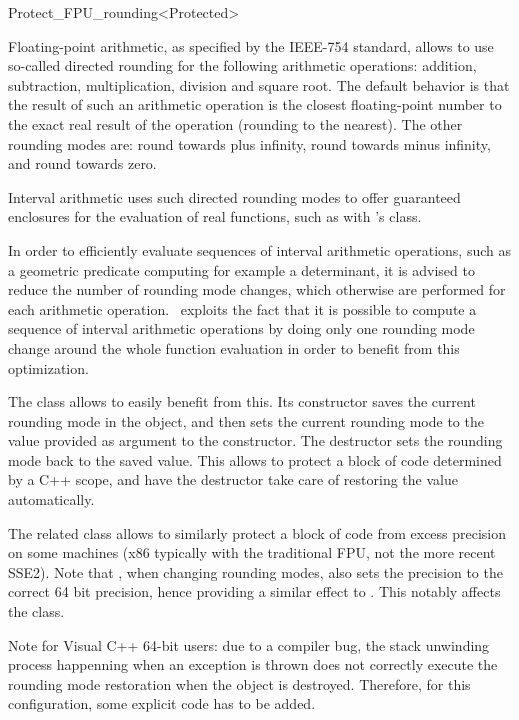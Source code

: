 
\begin{ccRefClass}{Protect_FPU_rounding<Protected>}
\label{protect_fpu_rouding}

\ccDefinition

Floating-point arithmetic, as specified by the IEEE-754 standard, allows to use
so-called directed rounding for the following arithmetic operations: addition,
subtraction, multiplication, division and square root.  The default behavior is
that the result of such an arithmetic operation is the closest floating-point
number to the exact real result of the operation (rounding to the nearest).
The other rounding modes are: round towards plus infinity, round towards minus
infinity, and round towards zero.

Interval arithmetic uses such directed rounding modes to offer guaranteed
enclosures for the evaluation of real functions, such as with \cgal's
 class.

In order to efficiently evaluate sequences of interval arithmetic operations,
such as a geometric predicate computing for example a determinant, it is
advised to reduce the number of rounding mode changes, which otherwise are
performed for each arithmetic operation.  \cgal\ exploits the fact that it is
possible to compute a sequence of interval arithmetic operations by doing only
one rounding mode change around the whole function evaluation in order to
benefit from this optimization.

The class  allows to easily benefit from this.
Its constructor saves the current rounding mode in the object, and then sets
the current rounding mode to the value provided as argument to the constructor.
The destructor sets the rounding mode back to the saved value.
This allows to protect a block of code determined by a C++ scope, and have
the destructor take care of restoring the value automatically.

The related class  allows to similarly protect
a block of code from excess precision on some machines (x86 typically with
the traditional FPU, not the more recent SSE2).  Note that
, when changing rounding modes, also sets the precision
to the correct 64 bit precision, hence providing a similar effect to
.  This notably affects the  class.

Note for Visual C++ 64-bit users: due to a compiler bug, the stack unwinding
process happenning when an exception is thrown does not correctly execute the
rounding mode restoration when the  object is
destroyed.  Therefore, for this configuration, some explicit code has to be
added.


\end{ccRefClass}
